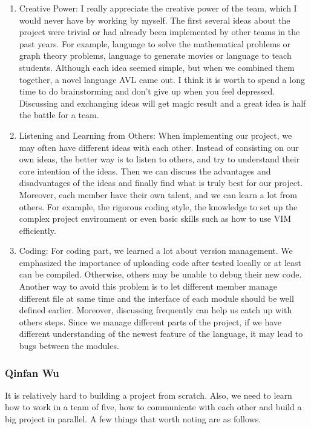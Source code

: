 \begin{enumerate}
\item Creative Power: I really appreciate the creative power of the team, which I would never have by
working by myself. The first several ideas about the project were trivial or had already been
implemented by other teams in the past years. For example, language to solve the mathematical
problems or graph theory problems, language to generate movies or language to teach students.
Although each idea seemed simple, but when we combined them together, a novel language AVL came out.
I think it is worth to spend a long time to do brainstorming and don't give up when you feel
depressed. Discussing and exchanging ideas will get magic result and a great idea is half the battle
for a team.
\item Listening and Learning from Others: When implementing our project, we may often have
	different ideas with each other. Instead of consisting on our own ideas, the better way is to
	listen to others, and try to understand their core intention of the ideas. Then we can discuss
	the advantages and disadvantages of the ideas and finally find what is truly best for our
	project. Moreover, each member have their own talent, and we can learn a lot from others. For
	example, the rigorous coding style, the knowledge to set up the complex project environment or
	even basic skills such as how to use VIM efficiently.
\item Coding: For coding part, we learned a lot about version management. We emphasized the
	importance of uploading code after tested locally or at least can be compiled. Otherwise, others
	may be unable to debug their new code. Another way to avoid this problem is to let different
	member manage different file at same time and the interface of each module should be well
	defined earlier. Moreover, discussing frequently can help us catch up with others steps. Since
	we manage different parts of the project, if we have different understanding of the newest
	feature of the language, it may lead to bugs between the modules.
\end{enumerate}

\subsubsection{Qinfan Wu}

It is relatively hard to building a project from scratch. Also, we need to learn how to work in
a team of five, how to communicate with each other and build a big project in parallel. A few
things that worth noting are as follows.

